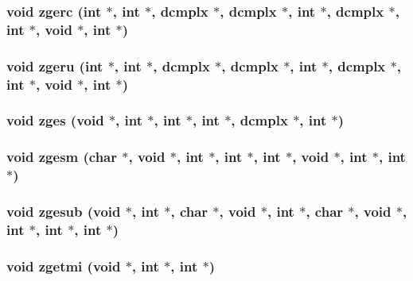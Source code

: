\subsubsection{\setlength{\rightskip}{0pt plus 5cm}void zgerc (int $\ast$, int $\ast$, {\bf dcmplx} $\ast$, {\bf dcmplx} $\ast$, int $\ast$, {\bf dcmplx} $\ast$, int $\ast$, void $\ast$, int $\ast$)}\label{essl_8h_5e000c285bdd6e8533e657b05a4e14df}


\subsubsection{\setlength{\rightskip}{0pt plus 5cm}void zgeru (int $\ast$, int $\ast$, {\bf dcmplx} $\ast$, {\bf dcmplx} $\ast$, int $\ast$, {\bf dcmplx} $\ast$, int $\ast$, void $\ast$, int $\ast$)}\label{essl_8h_d5de878fb3345c9a7b7f2d7414a8f3cc}


\subsubsection{\setlength{\rightskip}{0pt plus 5cm}void zges (void $\ast$, int $\ast$, int $\ast$, int $\ast$, {\bf dcmplx} $\ast$, int $\ast$)}\label{essl_8h_11dfe4243a3f8a3a8db486f59e4197a3}


\subsubsection{\setlength{\rightskip}{0pt plus 5cm}void zgesm (char $\ast$, void $\ast$, int $\ast$, int $\ast$, int $\ast$, void $\ast$, int $\ast$, int $\ast$)}\label{essl_8h_20bbb157a9e44812ee86e3aa2032865b}


\subsubsection{\setlength{\rightskip}{0pt plus 5cm}void zgesub (void $\ast$, int $\ast$, char $\ast$, void $\ast$, int $\ast$, char $\ast$, void $\ast$, int $\ast$, int $\ast$, int $\ast$)}\label{essl_8h_d6eebcfda02bfcd13bcc22e7c22af9ea}


\subsubsection{\setlength{\rightskip}{0pt plus 5cm}void zgetmi (void $\ast$, int $\ast$, int $\ast$)}\label{essl_8h_3258e70b4f4be276c9f73ae38a2616cf}


